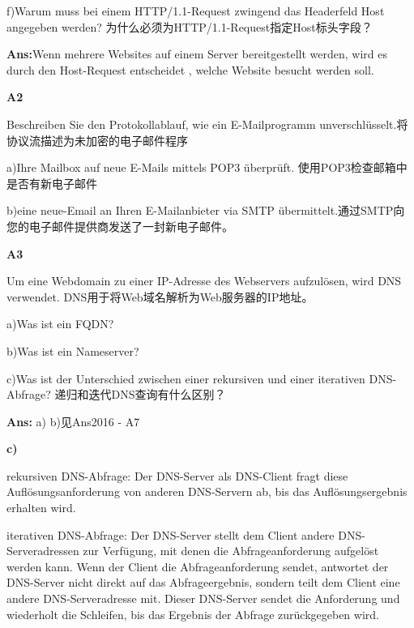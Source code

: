 \documentclass[fleqn]{article}
\begin{document}
f)Warum  muss  bei  einem  HTTP/1.1-Request zwingend  das  Headerfeld  Host  angegeben werden? 
为什么必须为HTTP/1.1-Request指定Host标头字段？

\textbf{Ans:}Wenn mehrere Websites auf einem Server bereitgestellt werden, wird es durch den Host-Request entscheidet , welche Website  besucht werden soll.

\noindent\textbf{A2}

Beschreiben Sie den Protokollablauf, wie ein E-Mailprogramm unverschlüsselt.将协议流描述为未加密的电子邮件程序 

a)Ihre Mailbox auf neue E-Mails mittels POP3 überprüft. 使用POP3检查邮箱中是否有新电子邮件

b)eine neue-Email an Ihren E-Mailanbieter via SMTP übermittelt.通过SMTP向您的电子邮件提供商发送了一封新电子邮件。

\noindent\textbf{A3}

Um  eine  Webdomain  zu  einer  IP-Adresse  des Webservers aufzulösen, wird DNS verwendet. 
DNS用于将Web域名解析为Web服务器的IP地址。

a)Was ist ein FQDN? 

b)Was ist ein Nameserver? 

c)Was  ist  der  Unterschied  zwischen  einer rekursiven und einer iterativen DNS-Abfrage?
递归和迭代DNS查询有什么区别？

\textbf{Ans:} a) b)见Ans2016 - A7

\textbf{c)}

rekursiven DNS-Abfrage: Der DNS-Server als DNS-Client fragt diese Auflösungsanforderung von anderen DNS-Servern ab, bis das Auflösungsergebnis erhalten wird.

iterativen DNS-Abfrage: Der DNS-Server stellt dem Client andere DNS-Serveradressen zur Verfügung, mit denen die Abfrageanforderung aufgelöst werden kann. Wenn der Client die Abfrageanforderung sendet, antwortet der DNS-Server nicht direkt auf das Abfrageergebnis, sondern teilt dem Client eine andere DNS-Serveradresse mit. Dieser DNS-Server sendet die Anforderung und wiederholt die Schleifen, bis das Ergebnis der Abfrage zurückgegeben wird.
\end{document}
